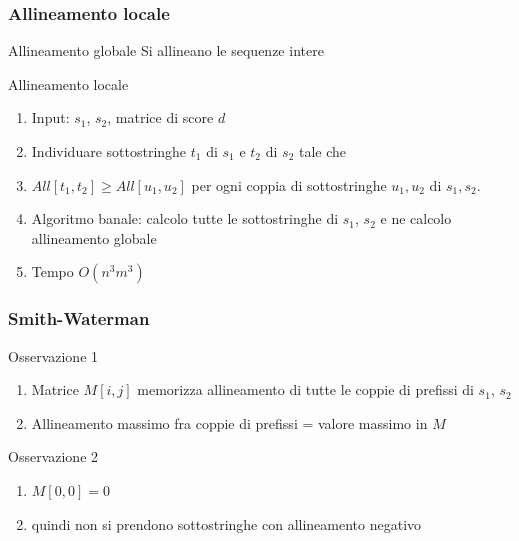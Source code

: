 \begin{frame}[fragile]
\frametitle{Allineamento locale}
\begin{block}{Allineamento globale}
Si allineano le sequenze intere
\end{block}
\begin{block}{Allineamento locale}
\begin{enumerate}
\item
Input: $s_{1}$, $s_{2}$, matrice di score $d$
\item
Individuare sottostringhe $t_{1}$ di $s_{1}$ e $t_{2}$ di $s_{2}$ tale che
\item
$All[t_{1}, t_{2}] \geq All[u_{1}, u_{2}]$ per ogni coppia di sottostringhe
$u_{1}, u_{2}$ di $s_{1}, s_{2}$.
\item
Algoritmo banale:
calcolo tutte le sottostringhe di $s_{1}$, $s_{2}$ e ne
calcolo allineamento globale
\item
Tempo $O(n^{3}m^{3})$
\end{enumerate}
\end{block}
\end{frame}

\begin{frame}[fragile]
\frametitle{Smith-Waterman}
\begin{block}{Osservazione 1}
\begin{enumerate}
\item
Matrice $M[i,j]$ memorizza allineamento di tutte le coppie di \alert{prefissi} di
$s_{1}$, $s_{2}$
\item
Allineamento massimo fra coppie di prefissi = valore massimo in $M$
\end{enumerate}
\end{block}
\begin{block}{Osservazione 2}
\begin{enumerate}
\item
$M[0,0] = 0$
\item
quindi non si prendono sottostringhe con allineamento negativo
\end{enumerate}
\end{block}
\end{frame}

